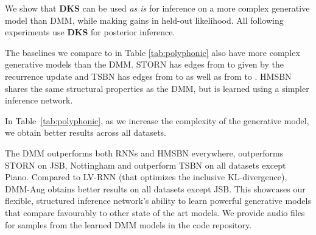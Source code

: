 \documentclass[letterpaper]{article}
\theoremstyle{plain}
\newcommand{\DKF}{DMM\xspace}
\newcommand{\DMM}{DMM\xspace}
\newcommand{\DKS}{\textbf{DKS}\xspace}
\begin{document}
{We show that \textbf{\DKS} can be used \emph{as is} for inference on 
a more complex generative model than \DMM, while making gains in held-out likelihood. All following experiments use {\bf \DKS} for posterior inference.

The baselines we compare to in Table \ref{tab:polyphonic} also have more complex generative models than the \DKF. 
STORN has edges from  to  given by the recurrence update
and TSBN has edges from  to  as well as from  to .  
HMSBN shares
the same structural properties as the \DKF, but
is learned using a simpler inference network. 

In Table~\ref{tab:polyphonic}, 
as we increase the complexity of the generative model, we obtain better results across all datasets. 

The \DKF outperforms both RNNs and HMSBN everywhere, outperforms STORN on JSB, Nottingham 
and outperform TSBN on all datasets except Piano. 
Compared to LV-RNN (that optimizes the inclusive KL-divergence), 
\DKF-Aug obtains better results on all datasets except JSB. This showcases our flexible, structured inference network's ability to learn 
powerful generative models that compare favourably to other 
state of the art models. We provide audio
files for samples from the learned \DMM models in the code repository. 

}
\end{document}
